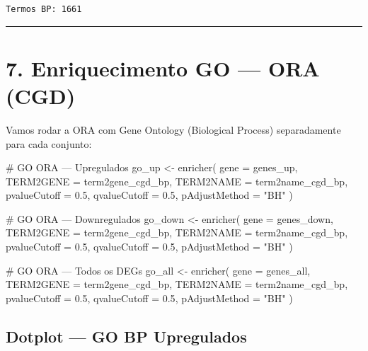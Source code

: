 \documentclass[
  letterpaper,
  DIV=11,
  numbers=noendperiod]{scrreprt}
\newenvironment{Shaded}{\begin{snugshade}}{\end{snugshade}}
\newcommand{\AttributeTok}[1]{\textcolor[rgb]{0.40,0.45,0.13}{#1}}
\newcommand{\CommentTok}[1]{\textcolor[rgb]{0.37,0.37,0.37}{#1}}
\newcommand{\FloatTok}[1]{\textcolor[rgb]{0.68,0.00,0.00}{#1}}
\newcommand{\FunctionTok}[1]{\textcolor[rgb]{0.28,0.35,0.67}{#1}}
\newcommand{\NormalTok}[1]{\textcolor[rgb]{0.00,0.23,0.31}{#1}}
\newcommand{\OtherTok}[1]{\textcolor[rgb]{0.00,0.23,0.31}{#1}}
\newcommand{\StringTok}[1]{\textcolor[rgb]{0.13,0.47,0.30}{#1}}
\begin{document}
\begin{verbatim}
Termos BP: 1661 
\end{verbatim}

\begin{center}\rule{0.5\linewidth}{0.5pt}\end{center}

\section{7. Enriquecimento GO --- ORA
(CGD)}\label{enriquecimento-go-ora-cgd}

Vamos rodar a ORA com Gene Ontology (Biological Process) separadamente
para cada conjunto:

\begin{Shaded}
\begin{Highlighting}[]
\CommentTok{\# GO ORA — Upregulados}
\NormalTok{go\_up }\OtherTok{\textless{}{-}} \FunctionTok{enricher}\NormalTok{(}
  \AttributeTok{gene =}\NormalTok{ genes\_up,}
  \AttributeTok{TERM2GENE =}\NormalTok{ term2gene\_cgd\_bp,}
  \AttributeTok{TERM2NAME =}\NormalTok{ term2name\_cgd\_bp,}
  \AttributeTok{pvalueCutoff =} \FloatTok{0.5}\NormalTok{, }\AttributeTok{qvalueCutoff =} \FloatTok{0.5}\NormalTok{, }\AttributeTok{pAdjustMethod =} \StringTok{"BH"}
\NormalTok{)}

\CommentTok{\# GO ORA — Downregulados}
\NormalTok{go\_down }\OtherTok{\textless{}{-}} \FunctionTok{enricher}\NormalTok{(}
  \AttributeTok{gene =}\NormalTok{ genes\_down,}
  \AttributeTok{TERM2GENE =}\NormalTok{ term2gene\_cgd\_bp,}
  \AttributeTok{TERM2NAME =}\NormalTok{ term2name\_cgd\_bp,}
  \AttributeTok{pvalueCutoff =} \FloatTok{0.5}\NormalTok{, }\AttributeTok{qvalueCutoff =} \FloatTok{0.5}\NormalTok{, }\AttributeTok{pAdjustMethod =} \StringTok{"BH"}
\NormalTok{)}

\CommentTok{\# GO ORA — Todos os DEGs}
\NormalTok{go\_all }\OtherTok{\textless{}{-}} \FunctionTok{enricher}\NormalTok{(}
  \AttributeTok{gene =}\NormalTok{ genes\_all,}
  \AttributeTok{TERM2GENE =}\NormalTok{ term2gene\_cgd\_bp,}
  \AttributeTok{TERM2NAME =}\NormalTok{ term2name\_cgd\_bp,}
  \AttributeTok{pvalueCutoff =} \FloatTok{0.5}\NormalTok{, }\AttributeTok{qvalueCutoff =} \FloatTok{0.5}\NormalTok{, }\AttributeTok{pAdjustMethod =} \StringTok{"BH"}
\NormalTok{)}
\end{Highlighting}
\end{Shaded}

\subsection{Dotplot --- GO BP
Upregulados}\label{dotplot-go-bp-upregulados}
\end{document}
